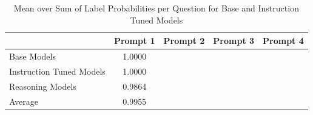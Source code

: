 
\begin{table}[h]
    \centering
    \begin{tabular}{lcccc}
        \toprule
        & Prompt 1 & Prompt 2 & Prompt 3 & Prompt 4 \\
        \midrule
        Base Models & 1.0000 \\
        Instruction Tuned Models & 1.0000 \\
        Reasoning Models & 0.9864 \\
        Average & 0.9955 \\
        \bottomrule
    \end{tabular}
    \caption{Mean over Sum of Label Probabilities per Question for Base and Instruction Tuned Models}
    \label{tab:labelprobsum}
\end{table}
